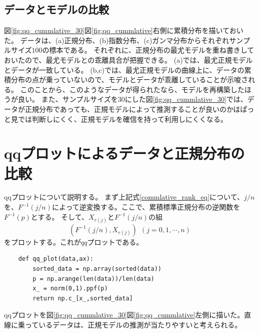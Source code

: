 \subsection{データとモデルの比較}
図\ref{fig:qq_cummlative_30}図\ref{fig:qq_cummlative}右側に累積分布を描いておいた。
データは、(a)正規分布、(b)指数分布、(c)ガンマ分布からそれぞれサンプルサイズ$100$の標本である。
それぞれに、正規分布の最尤モデルを重ね書きしておいたので、最尤モデルとの乖離具合が把握できる。
(a)では、最尤正規モデルとデータが一致している。
(b,c)では、最尤正規モデルの曲線上に、データの累積分布の点が乗っていないので、モデルとデータが乖離していることが示唆される。
このことから、このようなデータが得られたなら、モデルを再構築したほうが良い。
また、サンプルサイズを30にした図\ref{fig:qq_cummlative_30}では、データが正規分布であっても、正規モデルによって推測することが良いのかはぱっと見では判断しにくく、正規モデルを確信を持って利用しにくくなる。

\section{qqプロットによるデータと正規分布の比較}
qqプロットについて説明する。
まず上記式\ref{commlative_rank_eq}について、$j/n$を、$F^{-1}(j/n)$によって逆変換する。ここで、累積標準正規分布の逆関数を$F^{-1}(p)$とする。
そして、$X_{r(j)}$と$F^{-1}(j/n)$の組
\begin{equation*}
(F^{-1}(j/n),X_{r(j)}) \ \ (j=0,1,\cdots,n)
\end{equation*}
をプロットする。これが$qq$プロットである。

\begin{lstlisting}
    def qq_plot(data,ax):
        sorted_data = np.array(sorted(data))
        p = np.arange(len(data))/len(data)
        x_ = norm(0,1).ppf(p)
        return np.c_[x_,sorted_data]
\end{lstlisting}


qqプロットを図\ref{fig:qq_cummlative_30}図\ref{fig:qq_cummlative}左側に描いた。直線に乗っているデータは、正規モデルの推測が当たりやすいと考えられる。

